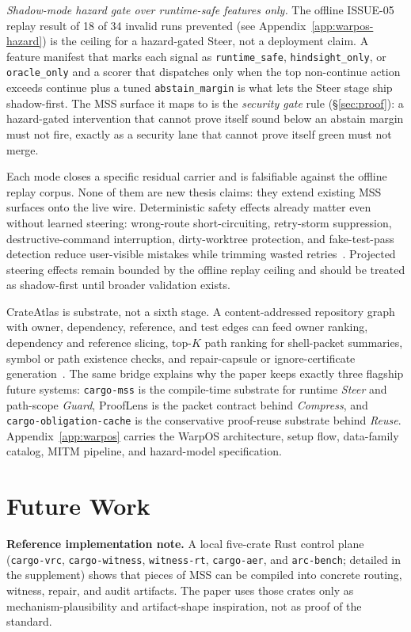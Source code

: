 \documentclass[conference]{IEEEtran}
\newcommand{\mss}{\textnormal{\textsc{MSS}}}
\begin{document}
\emph{Shadow-mode hazard gate over runtime-safe features only.} The offline ISSUE-05 replay result of 18 of 34 invalid runs prevented (see Appendix~\ref{app:warpos-hazard}) is the ceiling for a hazard-gated Steer, not a deployment claim. A feature manifest that marks each signal as \texttt{runtime\_safe}, \texttt{hindsight\_only}, or \texttt{oracle\_only} and a scorer that dispatches only when the top non-continue action exceeds continue plus a tuned \texttt{abstain\_margin} is what lets the Steer stage ship shadow-first. The MSS surface it maps to is the \emph{security gate} rule (\S\ref{sec:proof}): a hazard-gated intervention that cannot prove itself sound below an abstain margin must not fire, exactly as a security lane that cannot prove itself green must not merge.

Each mode closes a specific residual carrier and is falsifiable against the offline replay corpus. None of them are new thesis claims: they extend existing MSS surfaces onto the live wire. Deterministic safety effects already matter even without learned steering: wrong-route short-circuiting, retry-storm suppression, destructive-command interruption, dirty-worktree protection, and fake-test-pass detection reduce user-visible mistakes while trimming wasted retries~\cite{warposInterventionCatalog2026}. Projected steering effects remain bounded by the offline replay ceiling and should be treated as shadow-first until broader validation exists.

CrateAtlas is substrate, not a sixth stage. A content-addressed repository graph with owner, dependency, reference, and test edges can feed owner ranking, dependency and reference slicing, top-$K$ path ranking for shell-packet summaries, symbol or path existence checks, and repair-capsule or ignore-certificate generation~\cite{crateAtlas2026}. The same bridge explains why the paper keeps exactly three flagship future systems: \texttt{cargo-mss} is the compile-time substrate for runtime \emph{Steer} and path-scope \emph{Guard}, ProofLens is the packet contract behind \emph{Compress}, and \texttt{cargo-obligation-cache} is the conservative proof-reuse substrate behind \emph{Reuse}. Appendix~\ref{app:warpos} carries the WarpOS architecture, setup flow, data-family catalog, MITM pipeline, and hazard-model specification.

\section{Future Work}
\label{sec:future}
\noindent\textbf{Reference implementation note.} A local five-crate Rust control plane (\texttt{cargo-vrc}, \texttt{cargo-witness}, \texttt{witness-rt}, \texttt{cargo-aer}, and \texttt{arc-bench}; detailed in the supplement) shows that pieces of \mss{} can be compiled into concrete routing, witness, repair, and audit artifacts. The paper uses those crates only as mechanism-plausibility and artifact-shape inspiration, not as proof of the standard.
\end{document}
